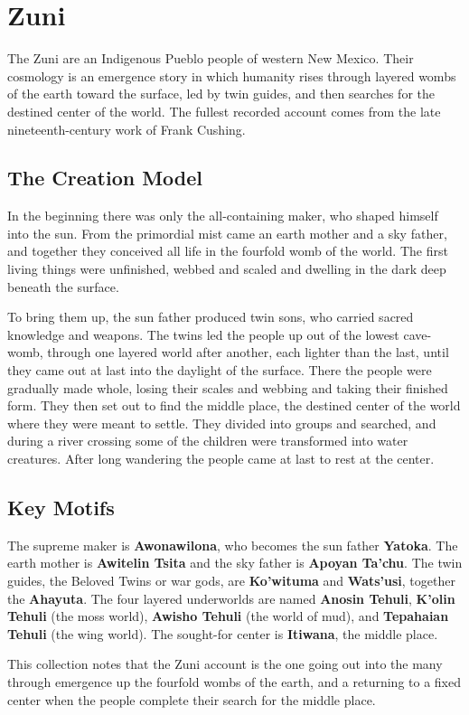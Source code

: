 \section{Zuni}

The Zuni are an Indigenous Pueblo people of western New Mexico. Their cosmology is an emergence story in which humanity rises through layered wombs of the earth toward the surface, led by twin guides, and then searches for the destined center of the world. The fullest recorded account comes from the late nineteenth-century work of Frank Cushing.

\subsection{The Creation Model}

In the beginning there was only the all-containing maker, who shaped himself into the sun. From the primordial mist came an earth mother and a sky father, and together they conceived all life in the fourfold womb of the world. The first living things were unfinished, webbed and scaled and dwelling in the dark deep beneath the surface.

To bring them up, the sun father produced twin sons, who carried sacred knowledge and weapons. The twins led the people up out of the lowest cave-womb, through one layered world after another, each lighter than the last, until they came out at last into the daylight of the surface. There the people were gradually made whole, losing their scales and webbing and taking their finished form. They then set out to find the middle place, the destined center of the world where they were meant to settle. They divided into groups and searched, and during a river crossing some of the children were transformed into water creatures. After long wandering the people came at last to rest at the center.

\subsection{Key Motifs}

The supreme maker is \textbf{Awonawilona}, who becomes the sun father \textbf{Yatoka}. The earth mother is \textbf{Awitelin Tsita} and the sky father is \textbf{Apoyan Ta'chu}. The twin guides, the Beloved Twins or war gods, are \textbf{Ko'wituma} and \textbf{Wats'usi}, together the \textbf{Ahayuta}. The four layered underworlds are named \textbf{Anosin Tehuli}, \textbf{K'olin Tehuli} (the moss world), \textbf{Awisho Tehuli} (the world of mud), and \textbf{Tepahaian Tehuli} (the wing world). The sought-for center is \textbf{Itiwana}, the middle place.

This collection notes that the Zuni account is the one going out into the many through emergence up the fourfold wombs of the earth, and a returning to a fixed center when the people complete their search for the middle place.
